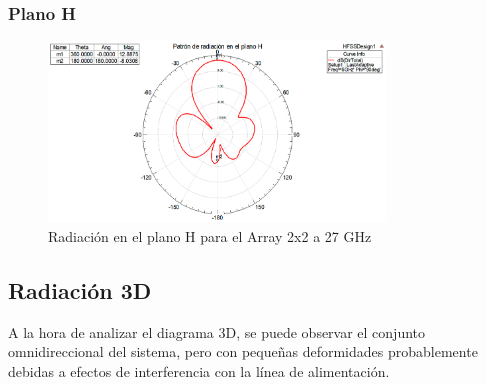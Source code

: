 \subsubsection{Plano H}
\begin{figure}[H]
    \centering
        \includegraphics[width=0.8\textwidth]{archivos/analisis/2x23/5}
        \caption{Radiación en el plano H para el Array 2x2 a 27 GHz}
        \label{fig:H2x23}
\end{figure}

\newpage
\subsection{Radiación 3D}
\par A la hora de analizar el diagrama 3D, se puede observar el conjunto omnidireccional del sistema, pero con pequeñas deformidades probablemente debidas a efectos de interferencia con la línea de alimentación. 

